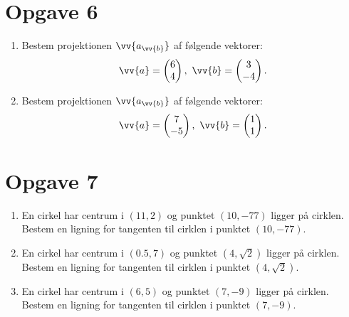 \section*{Opgave 6}
\begin{enumerate}[label=\roman*)]
	\item Bestem projektionen $\vv{a_{\vv{b}}}$ af følgende vektorer:
	\begin{align*}
		\vv{a} = 
		\begin{pmatrix}
			6  \\ 4
		\end{pmatrix},
		\ \vv{b} =
		\begin{pmatrix}
			3 \\ -4
		\end{pmatrix}.
	\end{align*}	
	\item Bestem projektionen $\vv{a_{\vv{b}}}$ af følgende vektorer:
	\begin{align*}
		\vv{a} = 
		\begin{pmatrix}
			7  \\ -5
		\end{pmatrix},
		\ \vv{b} =
		\begin{pmatrix}
			1 \\ 1
		\end{pmatrix}.
	\end{align*}	
\end{enumerate}

\section*{Opgave 7}
\begin{enumerate}[label=\roman*)]
	\item En cirkel har centrum i $(11,2)$ og punktet $(10,-77)$ ligger på cirklen. Bestem en ligning for tangenten til 
	cirklen i punktet $(10,-77)$.
	\item En cirkel har centrum i $(0.5,7)$ og punktet $(4,\sqrt{2})$ ligger på cirklen. Bestem en ligning for
	tangenten til cirklen i punktet $(4,\sqrt{2})$.
	\item En cirkel har centrum i $(6,5)$ og punktet $(7,-9)$ ligger på cirklen. Bestem en ligning for tangenten til 
	cirklen i punktet $(7,-9)$.
\end{enumerate}